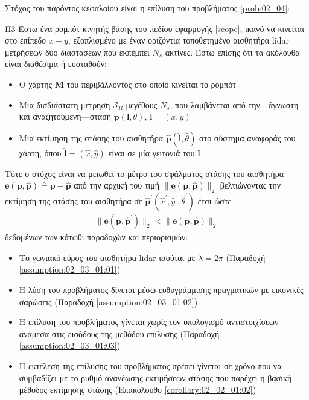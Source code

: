 Στόχος του παρόντος κεφαλαίου είναι η επίλυση του προβλήματος \ref{prob:02_04}:

\begin{bw_box}
\begin{customproblem}{Π3}
  \label{prob:02_04}
  Έστω ένα ρομπότ κινητής βάσης του πεδίου εφαρμογής \ref{scope}, ικανό να
  κινείται στο επίπεδο $x-y$, εξοπλισμένο με έναν οριζόντια τοποθετημένο
  αισθητήρα lidar μετρήσεων δύο διαστάσεων που εκπέμπει $N_s$ ακτίνες. Έστω
  επίσης ότι τα ακόλουθα είναι διαθέσιμα ή ευσταθούν:
  \begin{itemize}
    \item Ο χάρτης $\bm{M}$ του περιβάλλοντος στο οποίο κινείται το ρομπότ
    \item Μια δισδιάστατη μέτρηση $\mathcal{S}_R$ μεγέθους $N_s$, που λαμβάνεται
          από την---άγνωστη και αναζητούμενη---στάση $\bm{p}(\bm{l},\theta)$,
          $\bm{l} = (x,y)$
    \item Μια εκτίμηση της στάσης του αισθητήρα
          $\hat{\bm{p}}(\hat{\bm{l}}, \hat{\theta})$ στο σύστημα αναφοράς του
          χάρτη, όπου $\hat{\bm{l}} = (\hat{x}, \hat{y})$ είναι σε μία γειτονιά
          του $\bm{l}$
  \end{itemize}
\end{customproblem}
Τότε ο στόχος είναι να μειωθεί το μέτρο του σφάλματος στάσης του αισθητήρα
$\bm{e}(\bm{p}, \hat{\bm{p}}) \triangleq \bm{p}- \hat{\bm{p}}$ από την αρχική
του τιμή $\|\bm{e}(\bm{p}, \hat{\bm{p}})\|_2$
βελτιώνοντας την εκτίμηση της στάσης του αισθητήρα σε
$\hat{\bm{p}}^\prime(\hat{x}^\prime, \hat{y}^\prime, \hat{\theta}^\prime)$
έτσι ώστε
\begin{align}
  \|\bm{e}(\bm{p}, \hat{\bm{p}}^\prime)\|_2 < \|\bm{e}(\bm{p}, \hat{\bm{p}})\|_2
  \tag{$\astt$}
  \label{objective:02_04}
\end{align}
δεδομένων των κάτωθι παραδοχών και περιορισμών:
\begin{itemize}
  \item Το γωνιακό εύρος του αισθητήρα lidar ισούται με $\lambda = 2\pi$
        (Παραδοχή \ref{assumption:02_03_01:01})
  \item Η λύση του προβλήματος δίνεται μέσω ευθυγράμμισης πραγματικών με εικονικές
        σαρώσεις (Παραδοχή \ref{assumption:02_03_01:02})
  \item Η επίλυση του προβλήματος γίνεται χωρίς τον υπολογισμό αντιστοιχίσεων
        ανάμεσα στις εισόδους της μεθόδου επίλυσης (Παραδοχή
        \ref{assumption:02_03_01:03})
  \item Η εκτέλεση της επίλυσης του προβλήματος πρέπει γίνεται σε χρόνο που να
        συμβαδίζει με το ρυθμό ανανέωσης εκτιμήσεων στάσης που παρέχει η βασική
        μέθοδος εκτίμησης στάσης (Επακόλουθο \ref{corollary:02_02_01:02})
\end{itemize}

\end{bw_box}


